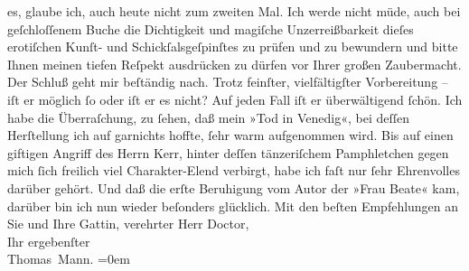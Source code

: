 \begin{ledgroupsized}[t]{13cm}
               es, glaube ich, auch heute {\pb}nicht zum
               zweiten Mal. Ich werde nicht müde, auch bei geſchloſſenem Buche die Dichtigkeit und
               magiſche Unzerreißbarkeit dieſes erotiſchen Kunſt- und Schickſalsgeſpinſtes zu prüfen
               und zu bewundern und bitte Ihnen meinen tiefen Reſpekt ausdrücken zu dürfen vor Ihrer
               großen Zaubermacht. Der Schluß geht mir beſtändig nach. Trotz feinſter,
               vielfältigſter Vorbereitung – iſt er möglich ſo oder iſt er es nicht? Auf jeden Fall
               iſt er überwältigend ſchön.\pend
           \pstart
           Ich habe die Überraſchung, zu ſehen, daß mein »Tod in
                  Venedig«, bei deſſen Herſtellung ich {\pb}auf garnichts hoffte, ſehr warm
               aufgenommen wird. Bis auf einen giftigen Angriff des Herrn Kerr, hinter deſſen tänzeriſchem Pamphletchen gegen mich ſich freilich viel Charakter-Elend
               verbirgt, habe ich faſt nur ſehr Ehrenvolles darüber gehört. Und daß die erſte
               Beruhigung vom Autor der »Frau Beate« kam,
               darüber bin ich nun wieder beſonders glücklich.\pend
           \pstart
           Mit den beſten Empfehlungen an Sie und Ihre Gattin, verehrter Herr Doctor,{\\[\baselineskip]}Ihr ergebenſter{\\[\baselineskip]}\spacefill\mbox{Thomas Mann.}\pend
           \leftskip=0em{}
         
         \endnumbering{}\end{ledgroupsized}  \newcommand{\dateiname}{L02139}\newcommand{\titel}{Thomas Mann an Arthur Schnitzler, 22. 5. 1913}\newcommand{\editorInnen}{Martin Anton Müller und Gerd-Hermann Susen}
      